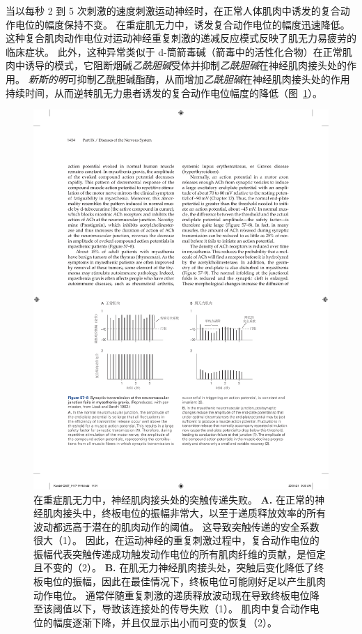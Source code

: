当以每秒 2 到 5 次刺激的速度刺激运动神经时，在正常人体肌肉中诱发的复合动作电位的幅度保持不变。
在重症肌无力中，诱发复合动作电位的幅度迅速降低。
这种复合肌肉动作电位对运动神经重复刺激的递减反应模式反映了肌无力易疲劳的临床症状。
此外，这种异常类似于 d-筒箭毒碱（箭毒中的活性化合物）在正常肌肉中诱导的模式，它阻断烟碱\textit{乙酰胆碱}受体并抑制\textit{乙酰胆碱}在神经肌肉接头处的作用。
\textit{新斯的明}可抑制乙酰胆碱酯酶，从而增加\textit{乙酰胆碱}在神经肌肉接头处的作用持续时间，从而逆转肌无力患者诱发的复合动作电位幅度的降低（图~\ref{fig:57_8}）。


\begin{figure}[htbp]
	\centering
	\includegraphics[width=0.95\linewidth]{chap57/fig_57_8}
	\caption{在重症肌无力中，神经肌肉接头处的突触传递失败。
		\textbf{A.} 在正常的神经肌肉接头中，终板电位的振幅非常大，以至于递质释放效率的所有波动都远高于潜在的肌肉动作的阈值。
		这导致突触传递的安全系数很大（1）。
		因此，在运动神经的重复刺激过程中，复合动作电位的振幅代表突触传递成功触发动作电位的所有肌肉纤维的贡献，是恒定且不变的（2）。
		\textbf{B.} 在肌无力神经肌肉接头处，突触后变化降低了终板电位的振幅，因此在最佳情况下，终板电位可能刚好足以产生肌肉动作电位。
		通常伴随重复刺激的递质释放波动现在导致终板电位降至该阈值以下，导致该连接处的传导失败（1）。
		肌肉中复合动作电位的幅度逐渐下降，并且仅显示出小而可变的恢复（2）。}
	\label{fig:57_8}
\end{figure}


